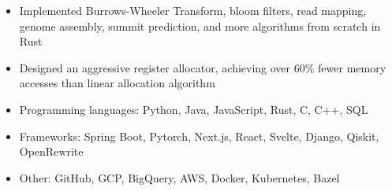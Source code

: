 \documentclass{article}
\begin{document}

\begin{itemize}
  \item
  Implemented Burrows-Wheeler Transform, bloom filters, read mapping, genome
  assembly, summit prediction, and more algorithms from scratch in Rust
\end{itemize}


\begin{itemize}
  \item
  Designed an aggressive register allocator, achieving over 60\% fewer memory
  accesses than linear allocation algorithm
\end{itemize}








\begin{itemize}
  \item Programming languages: Python, Java, JavaScript, Rust, C, C++, SQL
  \item Frameworks: Spring Boot, Pytorch, Next.js, React, Svelte, Django, Qiskit, OpenRewrite
  \item Other: GitHub, GCP, BigQuery, AWS, Docker, Kubernetes, Bazel
\end{itemize}
\end{document}
